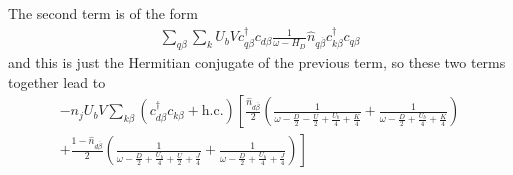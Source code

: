 \documentclass[10pt]{report}
\numberwithin{equation}{section}
\begin{document}
\begin{appendices}
The second term is of the form
\begin{equation}\begin{aligned}
	\sum_{q\beta}\sum_{k}U_b V c^\dagger_{q\beta}c_{d\beta} \frac{1}{\omega - H_D} \hat n_{q\overline\beta} c^\dagger_{k\beta}c_{q\beta}
\end{aligned}\end{equation}
and this is just the Hermitian conjugate of the previous term, so these two terms together lead to
\begin{equation}\begin{aligned}
	-n_jU_b V\sum_{k\beta} \left(c^\dagger_{d\beta} c_{k\beta} + \text{h.c.}\right) \left[\frac{\hat n_{d\overline\beta}}{2}\left(\frac{1}{\omega - \frac{D}{2} - \frac{U}{2} + \frac{U_b}{4} + \frac{K}{4}} + \frac{1}{\omega - \frac{D}{2} + \frac{U_b}{4} + \frac{K}{4}}\right) \right.\\
	+ \left.\frac{1-\hat n_{d\overline\beta}}{2}\left(\frac{1}{\omega - \frac{D}{2} + \frac{U_b}{4} + \frac{U}{2} + \frac{J}{4}} + \frac{1}{\omega - \frac{D}{2} + \frac{U_b}{4} + \frac{J}{4}}\right)\right]
\end{aligned}\end{equation}


\end{appendices}
\end{document}
